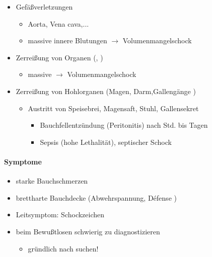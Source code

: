 \begin{itemize}
    \item Gef\"a{\ss}verletzungen
    \begin{itemize}
        \item Aorta, Vena cava,...
        \item massive innere Blutungen ${\rightarrow}$ Volumenmangelschock
    \end{itemize}
    \item Zerrei{\ss}ung  von Organen (,
    )
    \begin{itemize}
        \item massive  ${\rightarrow}$
        Volumenmangelschock
    \end{itemize}
    \item Zerrei{\ss}ung  von Hohlorganen (Magen, Darm,Galleng\"ange )
    \begin{itemize}
        \item Austritt von Speisebrei, Magensaft, Stuhl, Gallensekret
        \begin{itemize}
            \item Bauchfellentz\"undung (Peritonitis) nach Std. bis  Tagen
            \item Sepsis (hohe Lethalit\"at), septischer Schock
        \end{itemize}
    \end{itemize}
\end{itemize}

\paragraph{Symptome}

\begin{itemize}
    \item starke  Bauchschmerzen
    \item brettharte  Bauchdecke  (Abwehrspannung, D\'efense )
    \item Leitsymptom: Schockzeichen
    \item beim Bewu{\ss}tlosen schwierig zu  diagnostizieren
    \begin{itemize}
        \item gr\"undlich nach 
        suchen!
    \end{itemize}
\end{itemize}




